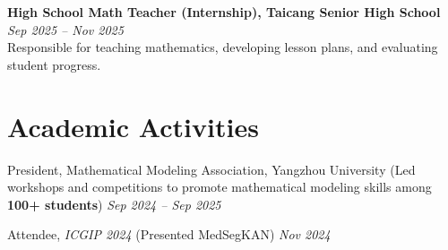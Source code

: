 \documentclass[10pt, letterpaper]{article}
\begin{document}
\textbf{High School Math Teacher (Internship), Taicang Senior High School} \hfill \textit{Sep 2025 – Nov 2025} \\
\vspace{0.1 cm}
Responsible for teaching mathematics, developing lesson plans, and evaluating student progress.

\vspace{0.10 cm}









 \section{Academic Activities}

 \noindent %

President, Mathematical Modeling Association, Yangzhou University (Led workshops and competitions to promote mathematical modeling skills among \textbf{100+ students}) \hfill \textit{Sep 2024 – Sep 2025}

  \vspace{0.15 cm}
  Attendee, \textit{ICGIP 2024} (Presented MedSegKAN)
   \hfill \textit{Nov 2024}





\vspace{0.08 cm}
    
\end{document}
